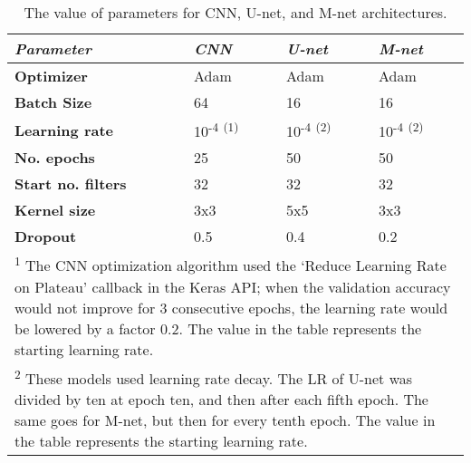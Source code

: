 \renewcommand{\arraystretch}{1.15}
\begin{table}[tb]
\caption{The value of parameters for CNN, U-net, and M-net architectures.}
\label{table:Hyperparameters}
\centering
\begin{tabular}{m{2.2cm}  m{1.5cm}  m{1.5cm}  m{1.5cm}}
\hline
\textit{Parameter} & \textit{CNN} & \textit{U-net} & \textit{M-net}\\
\hline
\textbf{Optimizer} & Adam & Adam & Adam \\
\textbf{Batch Size} & 64 & 16 & 16 \\
\textbf{Learning rate} & 10\textsuperscript{-4} \textsuperscript{(1)} & 10\textsuperscript{-4} \textsuperscript{(2)} & 10\textsuperscript{-4} \textsuperscript{(2)} \\
\textbf{No. epochs} & 25 & 50 & 50 \\
\textbf{Start no. filters} & 32 & 32 & 32 \\
\textbf{Kernel size} & 3x3 & 5x5 & 3x3 \\
\textbf{Dropout} & 0.5 & 0.4 & 0.2 \\
\hline
\multicolumn{4}{p{7.8cm}}{\textsuperscript{1} The CNN optimization algorithm used the `Reduce Learning Rate on Plateau' callback in the Keras API; when the validation accuracy would not improve for 3 consecutive epochs, the learning rate would be lowered by a factor 0.2. The value in the table represents the starting learning rate.}\\
\multicolumn{4}{p{7.8cm}}{\textsuperscript{2} These models used learning rate decay. The LR of U-net was divided by ten at epoch ten, and then after each fifth epoch. The same goes for M-net, but then for every tenth epoch. The value in the table represents the starting learning rate.} \\

\end{tabular}
\end{table}
